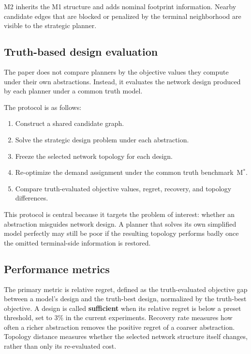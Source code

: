 \documentclass[review,authoryear]{elsarticle}
\begin{document}
M2 inherits the M1 structure and adds nominal footprint information. Nearby candidate edges that are blocked or penalized by the terminal neighborhood are visible to the strategic planner.

\subsection{Truth-based design evaluation}
\label{sec:models:evaluation}

The paper does not compare planners by the objective values they compute under their own abstractions. Instead, it evaluates the network design produced by each planner under a common truth model.

The protocol is as follows:
\begin{enumerate}
  \item Construct a shared candidate graph.
  \item Solve the strategic design problem under each abstraction.
  \item Freeze the selected network topology for each design.
  \item Re-optimize the demand assignment under the common truth benchmark~M$^*$.
  \item Compare truth-evaluated objective values, regret, recovery, and topology differences.
\end{enumerate}

This protocol is central because it targets the problem of interest: whether an abstraction misguides network design. A planner that solves its own simplified model perfectly may still be poor if the resulting topology performs badly once the omitted terminal-side information is restored.

\subsection{Performance metrics}
\label{sec:models:metrics}

The primary metric is relative regret, defined as the truth-evaluated objective gap between a model's design and the truth-best design, normalized by the truth-best objective. A design is called \textbf{sufficient} when its relative regret is below a preset threshold, set to 3\% in the current experiments. Recovery rate measures how often a richer abstraction removes the positive regret of a coarser abstraction. Topology distance measures whether the selected network structure itself changes, rather than only its re-evaluated cost.
\end{document}
